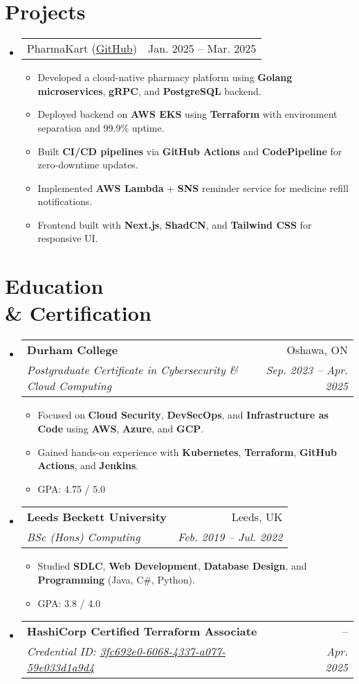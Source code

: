 \documentclass[letterpaper,11pt]{article}
\makeatletter
\newcommand{\resumeItem}[1]{\item\small{#1 \vspace{0pt}}}
\newcommand{\resumeSubheading}[4]{
  \vspace{-5pt}\item
    \begin{tabular*}{0.97\textwidth}[t]{l@{\extracolsep{\fill}}r}
      \textbf{#1} & #2 \\
      \textit{\small#3} & \textit{\small #4} \\
    \end{tabular*}\vspace{-7pt}
}
\newcommand{\resumeProjectHeading}[2]{
    \item
    \begin{tabular*}{0.97\textwidth}{l@{\extracolsep{\fill}}r}
      \small#1 & #2 \\
    \end{tabular*}\vspace{-7pt}
}
\makeatother
\begin{document}
\section*{Projects}
\begin{itemize}[leftmargin=*]
  \resumeProjectHeading{PharmaKart (\href{https://github.com/pharmakart/pharmakart-web}{GitHub})}{Jan. 2025 -- Mar. 2025}
  \begin{itemize}
    \resumeItem{Developed a cloud-native pharmacy platform using \textbf{Golang microservices}, \textbf{gRPC}, and \textbf{PostgreSQL} backend.}
    \resumeItem{Deployed backend on \textbf{AWS EKS} using \textbf{Terraform} with environment separation and 99.9\% uptime.}
    \resumeItem{Built \textbf{CI/CD pipelines} via \textbf{GitHub Actions} and \textbf{CodePipeline} for zero-downtime updates.}
    \resumeItem{Implemented \textbf{AWS Lambda} + \textbf{SNS} reminder service for medicine refill notifications.}
    \resumeItem{Frontend built with \textbf{Next.js}, \textbf{ShadCN}, and \textbf{Tailwind CSS} for responsive UI.}
  \end{itemize}
\end{itemize}

\section*{Education \\ \& Certification}
\begin{itemize}[leftmargin=*]
  \resumeSubheading{Durham College}{Oshawa, ON}{Postgraduate Certificate in Cybersecurity \& Cloud Computing}{Sep. 2023 -- Apr. 2025}
  \begin{itemize}
    \resumeItem{Focused on \textbf{Cloud Security}, \textbf{DevSecOps}, and \textbf{Infrastructure as Code} using \textbf{AWS}, \textbf{Azure}, and \textbf{GCP}.}
    \resumeItem{Gained hands-on experience with \textbf{Kubernetes}, \textbf{Terraform}, \textbf{GitHub Actions}, and \textbf{Jenkins}.}
    \resumeItem{GPA: 4.75 / 5.0}
  \end{itemize}

  \resumeSubheading{Leeds Beckett University}{Leeds, UK}{BSc (Hons) Computing}{Feb. 2019 -- Jul. 2022}
  \begin{itemize}
    \resumeItem{Studied \textbf{SDLC}, \textbf{Web Development}, \textbf{Database Design}, and \textbf{Programming} (Java, C\#, Python).}
    \resumeItem{GPA: 3.8 / 4.0}
  \end{itemize}

  \resumeSubheading{HashiCorp Certified Terraform Associate}{--}{Credential ID: \href{https://www.credly.com/badges/3fc692e0-6068-4337-a077-59e033d1a9d4/public_url}{3fc692e0-6068-4337-a077-59e033d1a9d4}}{Apr. 2025}
\end{itemize}
\end{document}
